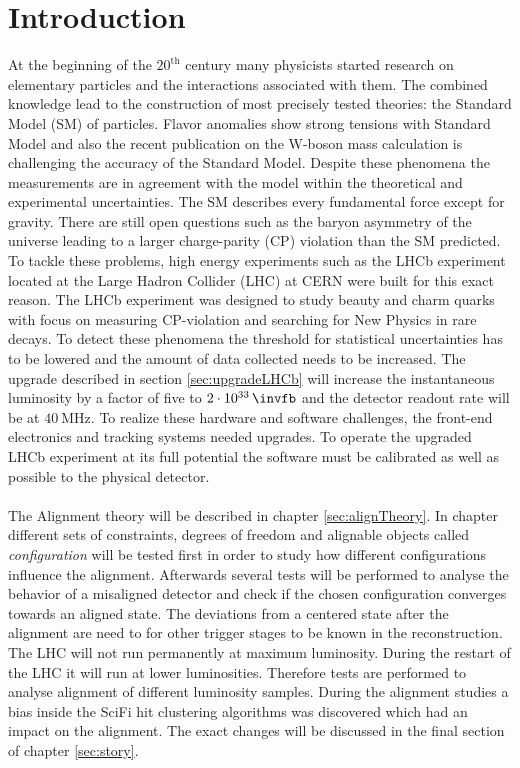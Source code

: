 \chapter{Introduction}
\label{sec:einleitung}

At the beginning of the $20^{\text{th}}$ century many physicists started research on
elementary particles and the interactions associated with them. The combined
knowledge lead to the construction of most precisely tested theories: the
Standard Model (SM) of particles.
Flavor anomalies show strong tensions with Standard Model and also the recent publication on the W-boson mass calculation is challenging the accuracy of the Standard Model. Despite these phenomena the measurements are in agreement
with the model within the theoretical and experimental uncertainties.
The SM describes every fundamental force except for gravity. There are still open
questions such as the baryon asymmetry of the universe leading to a larger
charge-parity (CP) violation than the SM predicted.
To tackle these problems, high energy experiments such as the LHCb experiment located at the Large Hadron Collider (LHC) at CERN were built for this exact reason.
The LHCb experiment was designed to study beauty and charm quarks with focus on measuring CP-violation and searching for New Physics in rare decays.
To detect these phenomena the threshold for statistical uncertainties has to
be lowered and the amount of data collected needs to be increased. The upgrade
described in section \ref{sec:upgradeLHCb} will increase the instantaneous
luminosity by a factor of five to $\SI{2e33}{\invfb}$ and
the detector readout rate will be at $\SI{40}{\mega\hertz}$. To realize these
hardware and software challenges, the front-end electronics and tracking systems needed upgrades.
To operate the upgraded LHCb experiment at its full potential the software must be
calibrated as well as possible to the physical detector.
\\
\\
The Alignment theory will be described in chapter \ref{sec:alignTheory}.
In chapter \label{sec:story} different sets of constraints, degrees of freedom
and alignable objects called \textit{configuration} will be tested first in order
to study how different configurations influence the alignment. Afterwards several
tests will be performed to analyse the behavior of a misaligned detector and check
if the chosen configuration converges towards an aligned state.
The deviations from a centered state after the alignment are need to for other trigger stages to be known in the reconstruction.
The LHC will not run permanently at maximum luminosity. During the restart of the LHC it will run at lower luminosities. Therefore tests are performed to analyse alignment of different luminosity samples. During the alignment studies a bias inside the SciFi hit clustering algorithms was discovered which had an impact on the alignment. The exact changes will be discussed in the final section of chapter \ref{sec:story}.
